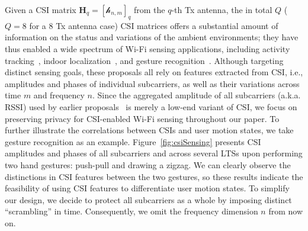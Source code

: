 \documentclass[conference,compsoc]{IEEEtran}
\newcommand{\rev}[1]{{\color{blue}#1}}      %
\newcommand{\newrev}[1]{{\color{blue}#1}}    %
\newcommand{\rev}[1]{#1}
\newcommand{\newrev}[1]{#1}
\begin{document}
Given a CSI matrix $\bm{H}_q = [\mathcal{h}_{n,m}]_q$ from 
\newrev{the $q$-th Tx antenna, the in total $Q$ ($Q = 8$ for a 8 Tx antenna case)}
CSI matrices %
offers a substantial amount of information on the status and variations of the ambient environments; they have thus enabled a wide spectrum of Wi-Fi sensing applications, including activity tracking~\cite{WiDeo-NSDI15}, indoor localization~\cite{LiFS-MobiCom16}, and gesture recognition~\cite{Widar3-MobiSys19}. Although targeting distinct sensing goals, these proposals all rely on features extracted from CSI, i.e., amplitudes and phases of individual subcarriers, as well as their variations across time $m$ and frequency $n$. Since the aggregated amplitude of all subcarriers (a.k.a. RSSI) used by earlier proposals~\cite{EtTuAlexa-NDSS20,IRShield-SP22} is merely a low-end variant of CSI, we focus on preserving privacy for CSI-enabled Wi-Fi sensing throughout our paper.
To further illustrate the correlations between CSIs and user motion states, we take gesture recognition as an example. Figure~\ref{fig:csiSensing} presents CSI amplitudes and phases of all subcarriers and across several LTSs upon performing two hand gestures: push-pull and drawing a zigzag. We can clearly observe the distinctions in CSI features 
between the two gestures, so these results indicate the feasibility of using CSI features to differentiate user motion states. \newrev{To simplify our design, we decide to protect all subcarriers as a whole by imposing distinct ``scrambling'' in time. Consequently, we omit the frequency dimension $n$ from now on.}
%
\end{document}
